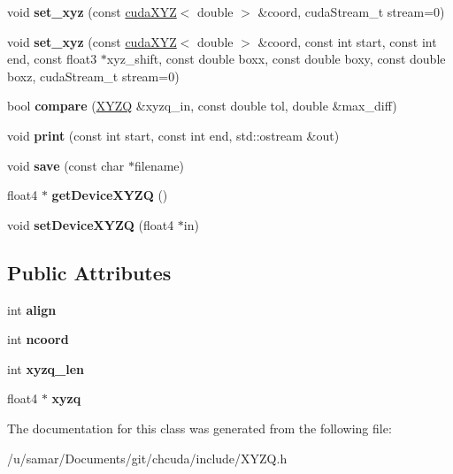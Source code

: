 \begin{DoxyCompactItemize}
\item 
\hypertarget{classXYZQ_a71c8b38cb9597607937afbaf096ade8f}{}\label{classXYZQ_a71c8b38cb9597607937afbaf096ade8f} 
void {\bfseries set\+\_\+xyz} (const \hyperlink{classcudaXYZ}{cuda\+X\+YZ}$<$ double $>$ \&coord, cuda\+Stream\+\_\+t stream=0)
\item 
\hypertarget{classXYZQ_abebf79ca3e939e8c120683b664941ee1}{}\label{classXYZQ_abebf79ca3e939e8c120683b664941ee1} 
void {\bfseries set\+\_\+xyz} (const \hyperlink{classcudaXYZ}{cuda\+X\+YZ}$<$ double $>$ \&coord, const int start, const int end, const float3 $\ast$xyz\+\_\+shift, const double boxx, const double boxy, const double boxz, cuda\+Stream\+\_\+t stream=0)
\item 
\hypertarget{classXYZQ_a8c241380db8116c4ee51c250a5ac488e}{}\label{classXYZQ_a8c241380db8116c4ee51c250a5ac488e} 
bool {\bfseries compare} (\hyperlink{classXYZQ}{X\+Y\+ZQ} \&xyzq\+\_\+in, const double tol, double \&max\+\_\+diff)
\item 
\hypertarget{classXYZQ_a1f2e73eb1e3e584b938fb85b1a90338c}{}\label{classXYZQ_a1f2e73eb1e3e584b938fb85b1a90338c} 
void {\bfseries print} (const int start, const int end, std\+::ostream \&out)
\item 
\hypertarget{classXYZQ_aefb394e8c57e748cd45d1d1b11efff91}{}\label{classXYZQ_aefb394e8c57e748cd45d1d1b11efff91} 
void {\bfseries save} (const char $\ast$filename)
\item 
\hypertarget{classXYZQ_a4a83bb66b6eaa28b739b2e33bd63c0fb}{}\label{classXYZQ_a4a83bb66b6eaa28b739b2e33bd63c0fb} 
float4 $\ast$ {\bfseries get\+Device\+X\+Y\+ZQ} ()
\item 
\hypertarget{classXYZQ_a47a1039f97b2b58f9c87b06f07371e69}{}\label{classXYZQ_a47a1039f97b2b58f9c87b06f07371e69} 
void {\bfseries set\+Device\+X\+Y\+ZQ} (float4 $\ast$in)
\end{DoxyCompactItemize}
\subsection*{Public Attributes}
\begin{DoxyCompactItemize}
\item 
\hypertarget{classXYZQ_ab8e50a45c8fc45ce746b0ac80938d9db}{}\label{classXYZQ_ab8e50a45c8fc45ce746b0ac80938d9db} 
int {\bfseries align}
\item 
\hypertarget{classXYZQ_a96a7ca11354e5df5bfa344cd9e171e50}{}\label{classXYZQ_a96a7ca11354e5df5bfa344cd9e171e50} 
int {\bfseries ncoord}
\item 
\hypertarget{classXYZQ_a70df9f6ea3ec361b9efc297bcfdbfa6e}{}\label{classXYZQ_a70df9f6ea3ec361b9efc297bcfdbfa6e} 
int {\bfseries xyzq\+\_\+len}
\item 
\hypertarget{classXYZQ_ab24be1814bde15c39f437fab575d03f7}{}\label{classXYZQ_ab24be1814bde15c39f437fab575d03f7} 
float4 $\ast$ {\bfseries xyzq}
\end{DoxyCompactItemize}


The documentation for this class was generated from the following file\+:\begin{DoxyCompactItemize}
\item 
/u/samar/\+Documents/git/chcuda/include/X\+Y\+Z\+Q.\+h\end{DoxyCompactItemize}
